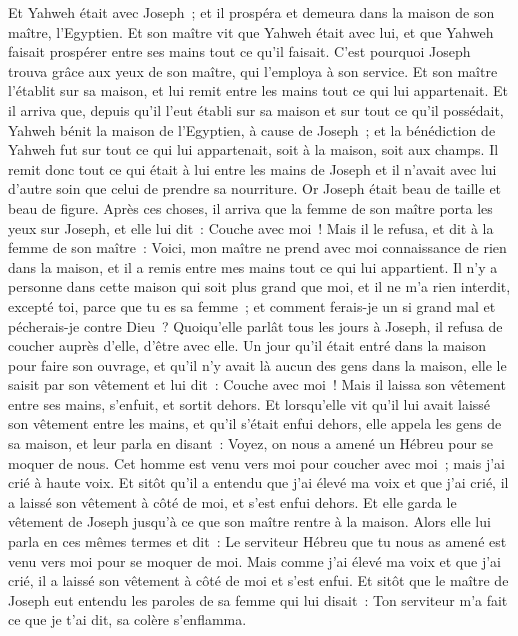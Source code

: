\begin{multicols}{2}
Et Yahweh était avec Joseph~; et il prospéra et demeura dans la maison de son maître, l'Egyptien.
Et son maître vit que Yahweh était avec lui, et que Yahweh faisait prospérer entre ses mains tout ce qu'il faisait.
C'est pourquoi Joseph trouva grâce aux yeux de son maître, qui l'employa à son service. Et son maître l'établit sur sa maison, et lui remit entre les mains tout ce qui lui appartenait.
Et il arriva que, depuis qu'il l'eut établi sur sa maison et sur tout ce qu'il possédait, Yahweh bénit la maison de l'Egyptien, à cause de Joseph~; et la bénédiction de Yahweh fut sur tout ce qui lui appartenait, soit à la maison, soit aux champs.
Il remit donc tout ce qui était à lui entre les mains de Joseph et il n'avait avec lui d'autre soin que celui de prendre sa nourriture. Or Joseph était beau de taille et beau de figure.
Après ces choses, il arriva que la femme de son maître porta les yeux sur Joseph, et elle lui dit~: Couche avec moi~!
Mais il le refusa, et dit à la femme de son maître~: Voici, mon maître ne prend avec moi connaissance de rien dans la maison, et il a remis entre mes mains tout ce qui lui appartient.
Il n'y a personne dans cette maison qui soit plus grand que moi, et il ne m'a rien interdit, excepté toi, parce que tu es sa femme~; et comment ferais-je un si grand mal et pécherais-je contre Dieu~?
Quoiqu'elle parlât tous les jours à Joseph, il refusa de coucher auprès d'elle, d'être avec elle.
Un jour qu'il était entré dans la maison pour faire son ouvrage, et qu'il n'y avait là aucun des gens dans la maison,
elle le saisit par son vêtement et lui dit~: Couche avec moi~! Mais il laissa son vêtement entre ses mains, s'enfuit, et sortit dehors.
Et lorsqu'elle vit qu'il lui avait laissé son vêtement entre les mains, et qu'il s'était enfui dehors,
elle appela les gens de sa maison, et leur parla en disant~: Voyez, on nous a amené un Hébreu pour se moquer de nous. Cet homme est venu vers moi pour coucher avec moi~; mais j'ai crié à haute voix.
Et sitôt qu'il a entendu que j'ai élevé ma voix et que j'ai crié, il a laissé son vêtement à côté de moi, et s'est enfui dehors.
Et elle garda le vêtement de Joseph jusqu'à ce que son maître rentre à la maison.
Alors elle lui parla en ces mêmes termes et dit~: Le serviteur Hébreu que tu nous as amené est venu vers moi pour se moquer de moi.
Mais comme j'ai élevé ma voix et que j'ai crié, il a laissé son vêtement à côté de moi et s'est enfui.
Et sitôt que le maître de Joseph eut entendu les paroles de sa femme qui lui disait~: Ton serviteur m'a fait ce que je t'ai dit, sa colère s'enflamma.

\end{multicols}
